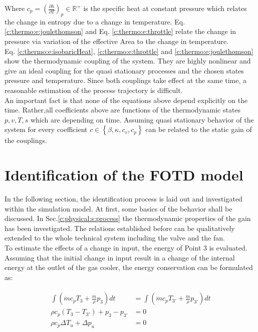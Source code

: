 Where $c_p = \left(\frac{\partial h}{\partial T} \right)_p \in \mathbb{R}^+$ is the specific heat at constant pressure which relates the change in entropy due to a change in temperature.
Eq. \ref{c:thermo:e:joulethomson} and Eq. \ref{c:thermo:e:throttle} relate the change in pressure via variation of the effective Area to the change in temperature. \\

Eq. \ref{c:thermo:e:isobaricHeat}, \ref{c:thermo:e:throttle} and \ref{c:thermo:e:joulethomson} show the thermodynamic coupling of the system. They are highly nonlinear and give an ideal coupling for the quasi stationary processes and the chosen states pressure and temperature. Since both couplings take effect at the same time, a reasonable estimation of the process trajectory is difficult. \\

An important fact is that none of the equations above depend explicitly on the time. Rather,all coefficients above are functions of the thermodynamic states $p,v,T,s$ which are depending on time. Assuming quasi stationary behavior of the system for every coefficient $c \in \left\lbrace \beta, \kappa, c_v, c_p \right\rbrace$ can be related to the static gain of the couplings.\\

\section{Identification of the FOTD model} \label{c:physical:s:identification}

In the following section, the identification process is laid out and investigated within the simulation model. At first, some basics of the behavior shall be discussed. In Sec.\ref{c:physical:s:process} the thermodynamic properties of the gain has been investigated. The relations established before can be qualitatively extended to the whole technical system including the valve and the fan.\\

To estimate the effects of a change in input, the energy of Point 3 is evaluated. Assuming that the initial change in input result in a change of the internal energy at the outlet of the gas cooler, the energy conservation can be formulated as:

\begin{align*}
\begin{split}
\int \left(\dot{m} c_p T_3 + \frac{\dot{m}}{\rho} p_3 \right) dt &=
\int \left(\dot{m} c_p T_{3'} + \frac{\dot{m}}{\rho} p_{3'} \right) dt \\
\rho c_p\left(T_{3} - T_{3'}\right)  + p_{3} - p_{3'} &= 0 \\
\rho c_p \Delta T_u + \Delta p_u &= 0
\end{split}
\end{align*}


